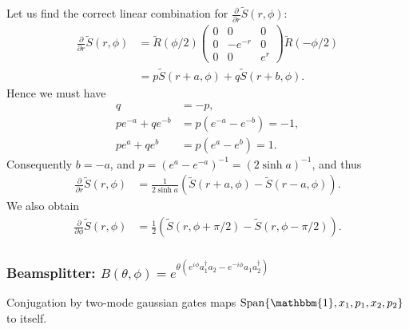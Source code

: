 \documentclass[aps,pra,10pt,twocolumn,groupedaddress,nofootinbib]{revtex4-1}
\theoremstyle{plain}
\DeclareMathOperator{\Span}{Span}  %
\newcommand{\pd}[2]{\frac{\partial #1}{\partial #2}}  %
\newcommand{\I}{\mathbbm{1}} %
\newcommand{\Admap}[1]{\tilde{#1}} %
\begin{document}
Let us find the correct linear combination for $\pd{}{r} \Admap{S}(r, \phi)$:
\begin{align*}
\pd{}{r} \Admap{S}(r, \phi)
&=
\Admap{R}(\phi/2)
\begin{pmatrix}
  0 & 0 & 0\\
  0 & -e^{-r} & 0\\
  0 & 0 & e^r
\end{pmatrix}
\Admap{R}(-\phi/2)\\
&= p\Admap{S}(r+a, \phi) +q\Admap{S}(r+b, \phi).
\end{align*}
Hence we must have
\begin{align*}
q &= -p,\\
pe^{-a} +qe^{-b} &= p(e^{-a} -e^{-b}) = -1,\\
pe^a +qe^b &= p(e^a -e^b) = 1.
\end{align*}
Consequently
$b = -a$, and
$p=(e^a-e^{-a})^{-1} = (2 \sinh a)^{-1}$, and thus
\begin{align*}
\pd{}{r} \Admap{S}(r, \phi)
&= \frac{1}{2 \sinh a} (\Admap{S}(r+a, \phi) -\Admap{S}(r-a, \phi)).
\end{align*}
We also obtain
\begin{align*}
\pd{}{\phi} \Admap{S}(r, \phi)
&= \frac{1}{2}(\Admap{S}(r, \phi+\pi/2) -\Admap{S}(r, \phi-\pi/2)).
\end{align*}



\subsubsection{Beamsplitter: $B(\theta, \phi) = e^{\theta (e^{i\phi} a_1^\dagger a_2 -e^{-i\phi} a_1 a_2^\dagger)}$}

Conjugation by two-mode gaussian gates maps
$\Span\{\I, x_1, p_1, x_2, p_2\}$ to itself.
\end{document}
